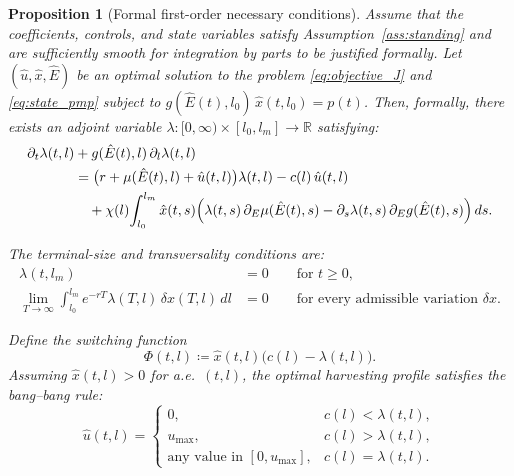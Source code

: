 \documentclass[pdflatex,sn-mathphys-num]{sn-jnl}
\theoremstyle{thmstyleone}
\newtheorem{proposition}[theorem]{Proposition}
\theoremstyle{definition}
\theoremstyle{remark}
\begin{document}
\begin{proposition}[Formal first-order necessary conditions]
\label{prop:necessary}
Assume that the coefficients, controls, and state variables satisfy
Assumption~\ref{ass:standing} and are sufficiently smooth for integration by parts to
be justified formally. Let $(\hat u, \hat x, \hat E)$ be an optimal solution to the problem
\eqref{eq:objective_J} and \eqref{eq:state_pmp} subject to
$g(\hat E(t),l_0)\,\hat x(t,l_0)=p(t)$. 
Then, formally, there exists an adjoint variable
$\lambda:[0,\infty)\times[l_0,l_m]\to\mathbb{R}$ satisfying:
\begin{align}\label{eq:adjoint}
\partial_t \lambda(t,l) &+ g(\hat E(t),l)\,\partial_l \lambda(t,l) \notag\\
&= \bigl(r + \mu(\hat E(t),l) + \hat u(t,l)\bigr)\lambda(t,l) - c(l)\,\hat u(t,l)
\notag \\
&\quad + \chi(l)\!\int_{l_0}^{l_m} \hat x(t,s) \Big(
   \lambda(t,s)\,\partial_E\mu(\hat E(t),s)
   - \partial_s\lambda(t,s)\,\partial_Eg(\hat E(t),s) \Big)\,ds.
\end{align}

The terminal-size and transversality conditions are:
\begin{align}
\lambda(t,l_m) &= 0 \qquad \text{for } t \ge 0,
   \label{eq:adjoint_boundary} \\
\lim_{T\to\infty} \int_{l_0}^{l_m} e^{-rT}\lambda(T,l)\,\delta x(T,l)\,dl &= 0
   \qquad \text{for every admissible variation } \delta x.
   \label{eq:transversality}
\end{align}

Define the switching function
\begin{equation}\label{eq:switching}
\Phi(t,l) \coloneqq \hat x(t,l)\bigl( c(l) - \lambda(t,l) \bigr).
\end{equation}
Assuming $\hat x(t,l)>0$ for a.e.\ $(t,l)$, the optimal harvesting profile satisfies the
bang--bang rule:
\begin{equation}\label{eq:opt_control}
\hat u(t,l)=
\begin{cases}
0, & c(l)<\lambda(t,l),\\[4pt]
u_{\max}, & c(l)>\lambda(t,l),\\[4pt]
\text{any value in }[0,u_{\max}], & c(l)=\lambda(t,l).
\end{cases}
\end{equation}
\end{proposition}
\end{document}
